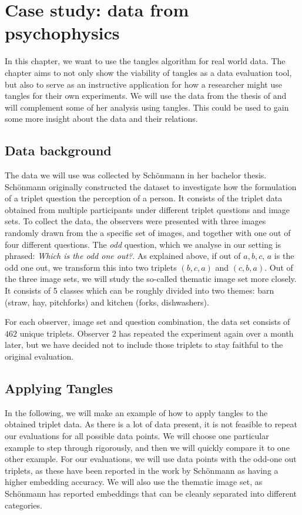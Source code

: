 \chapter{Case study: data from psychophysics}\label{real}
In this chapter, we want to use the tangles algorithm for real world data. 
The chapter aims to not only show the viability of tangles as a data evaluation tool, but also to serve as an 
instructive application for how a researcher might use tangles for their own experiments. We will use the data
from the thesis of \cite{inesschonmannSimilarityJudgementsNatural2021}
and will complement some of her analysis using tangles. This could be used to gain some more insight about the
data and their relations.

\section{Data background}
The data we will use was collected by Schönmann in her bachelor thesis. Schönmann originally
constructed the dataset to investigate how the formulation of a triplet question 
the perception of a person. It consists of the triplet data obtained from multiple
participants under different triplet questions and image sets.
To collect the data, the observers were presented with three images randomly drawn from the a specific set of images, and together with one out of four different questions. 
The \textit{odd} question, which we analyse in our setting is phrased: \textit{Which is the odd one out?}.  
As explained above, if out of $a,b,c$, $a$ is the odd one out, we transform this into two triplets $(b, c, a)$ and $(c, b, a)$.
Out of the three image sets, we will study the 
so-called thematic image set more closely. It consists of 5 classes which can be roughly divided into two themes: barn (straw, hay, pitchforks) and kitchen (forks, dishwashers).

For each observer, image set and question combination, the data set consists of $462$ unique triplets. 
Observer 2 has repeated the experiment again over a month later, but we have decided not to include those triplets to stay faithful to the original evaluation.

\section{Applying Tangles}
In the following, we will make an example of how to apply tangles to the obtained triplet data.
As there is a lot of data present, it is not feasible to repeat our evaluations for all possible data points.
We will choose one particular example to step through rigorously, and then we will quickly compare it to one other example. For our evaluations, we will use data points with the odd-one out triplets, as these have been reported in the work by Schönmann as 
having a higher embedding accuracy. We will also use the thematic image set, as Schönmann has reported embeddings that can be cleanly 
separated into different categories.


